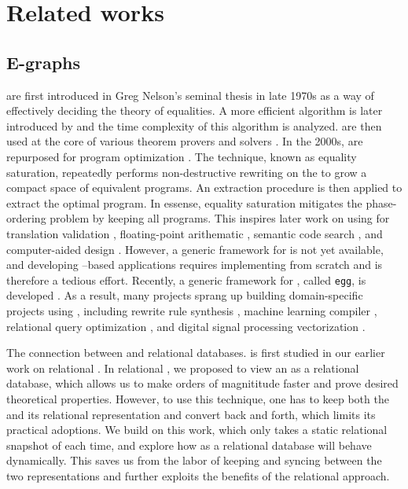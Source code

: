 \chapter{Related works}

\section{E-graphs}

\Egraphs are first introduced in Greg Nelson's seminal thesis \citep{nelson-thesis}
 in late 1970s 
 as a way of effectively deciding the theory of equalities.
A more efficient algorithm is later introduced by \citet{tarjan-congruence} 
 and the time complexity of this algorithm is analyzed.
\Egraphs are then used at the core of 
 various theorem provers and solvers \citep{simplify, z3, cvc4}.
In the 2000s, 
 \egraphs are repurposed for program optimization \citet{eqsat,denali}.
The technique, known as equality saturation, 
 repeatedly performs non-destructive rewriting on the \egraphs 
 to grow a compact space of equivalent programs.
An extraction procedure is then applied to extract the optimal program.
In essense, equality saturation mitigates the phase-ordering problem by keeping 
 all programs.
This inspires later work on using \egraphs for
 translation validation \citep{eqsat-tv}, 
 floating-point arithematic \citep{herbie},
 semantic code search \citep{semsearch},
 and computer-aided design \citep{carpentry-compiler}.
However, a generic framework for \egraphs is not yet available,
 and developing \egraphs--based applications
 requires implementing \egraphs from scratch and is therefore a tedious effort.
Recently, a generic framework for \egraphs, 
 called \texttt{egg}, is developed \citep{egg}.
As a result, many projects sprang up building domain-specific projects using \egraphs,
 including rewrite rule synthesis \citep{ruler}, machine learning compiler \citep{tensat,glenside},
 relational query optimization \citep{spores}, and
 digital signal processing vectorization \citep{diospyros}.

The connection between \egraphs and relational databases.
 is first studied in our earlier work on relational \ematching\citep{relational-ematching}.
In relational \ematching, 
 we proposed to view an \egraph as a relational database,
 which allows us to make \ematching orders of magnititude faster
 and prove desired theoretical properties.
However, to use this technique,
 one has to keep both the \egraph and its relational representation 
 and convert back and forth, which limits its practical adoptions.
We build on this work, 
 which only takes a static relational snapshot of \egraph each time,
 and explore how \egraphs as a relational database will behave dynamically.
This saves us from the labor of keeping and syncing between the two \egraph representations
 and further exploits the benefits of the relational \ematching approach.


